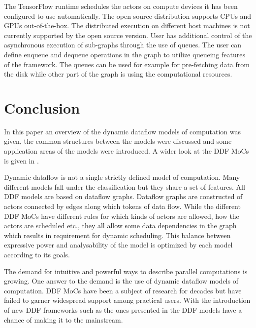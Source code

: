 \documentclass[conference,a4paper]{IEEEtran}
\begin{document}
The TensorFlow runtime schedules the actors on compute devices it has been
configured to use automatically. The open source distribution supports CPUs and
GPUs out-of-the-box. The distributed execution on different host machines is not
currently supported by the open source version. User has additional control of
the asynchronous execution of sub-graphs through the use of queues. The user can
define enqueue and dequeue operations in the graph to utilize queueing features
of the framework. The queues can be used for example for pre-fetching data from
the disk while other part of the graph is using the computational resources.
\cite{tensorflow2015-whitepaper}

\section{Conclusion}
In this paper an overview of the dynamic dataflow models of computation was
given, the common structures between the models were discussed and some
application areas of the models were introduced. A wider look at the DDF MoCs is
given in \cite{bhattacharyya2013handbook}.

Dynamic dataflow is not a single strictly defined model of computation. Many
different models fall under the classification but they share a set of features.
All DDF models are based on dataflow graphs. Dataflow graphs are constructed of
actors connected by edges along which tokens of data flow. While the different
DDF MoCs have different rules for which kinds of actors are allowed, how the
actors are scheduled etc., they all allow some data dependencies in the graph
which results in requirement for dynamic scheduling. This balance between
expressive power and analysability of the model is optimized by each model
according to its goals.

The demand for intuitive and powerful ways to describe parallel computations is
growing. One answer to the demand is the use of dynamic dataflow models of
computation. DDF MoCs have been a subject of research for decades but have
failed to garner widespread support among practical users. With the introduction
of new DDF frameworks such as the ones presented in \cite{murray2013naiad,
tensorflow2015-whitepaper} the DDF models have a chance of making it to the
mainstream.



\end{document}
